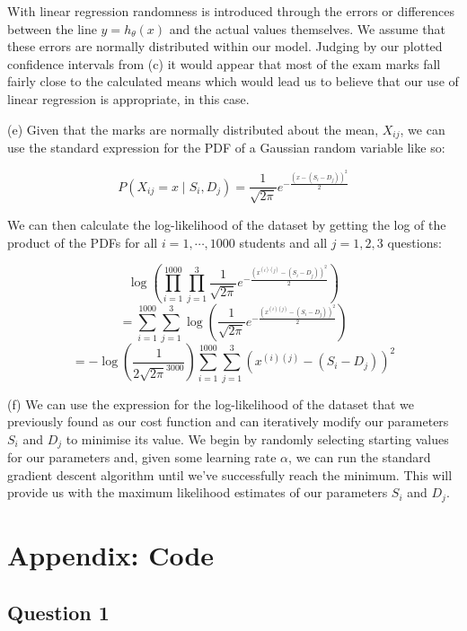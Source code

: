 \documentclass[10pt]{article}
\begin{document}
With linear regression randomness is introduced through the errors or differences between the line $y = h_{\theta}(x)$ and the actual values themselves. We assume that these errors are normally distributed within our model. Judging by our plotted confidence intervals from (c) it would appear that most of the exam marks fall fairly close to the calculated means which would lead us to believe that our use of linear regression is appropriate, in this case.

\noindent (e) Given that the marks are normally distributed about the mean, $X_{ij}$, we can use the standard expression for the PDF of a Gaussian random variable like so:

$$P(X_{ij} = x \mid S_i, D_j) = \frac{1}{\sqrt{2\pi}} e^{-\frac{(x - (S_i - D_j))^2}{2}}$$

We can then calculate the log-likelihood of the dataset by getting the log of the product of the PDFs for all $i = 1, \cdots, 1000$ students and all $j = 1, 2, 3$ questions:

$$\log \left( \prod_{i=1}^{1000} \prod_{j=1}^3 \frac{1}{\sqrt{2\pi}} e^{-\frac{(x^{(i)(j)} - (S_i - D_j))^2}{2}} \right)$$
$$= \sum_{i=1}^{1000} \sum_{j=1}^3 \log \left( \frac{1}{\sqrt{2\pi}} e^{-\frac{(x^{(i)(j)} - (S_i - D_j))^2}{2}} \right)$$
$$=- \log \left( \frac{1}{2\sqrt{2\pi}^{3000}} \right) \sum_{i=1}^{1000} \sum_{j=1}^{3} (x^{(i)(j)} - (S_i - D_j))^2$$

\noindent (f) We can use the expression for the log-likelihood of the dataset that we previously found as our cost function and can iteratively modify our parameters $S_i$ and $D_j$ to minimise its value. We begin by randomly selecting starting values for our parameters and, given some learning rate $\alpha$, we can run the standard gradient descent algorithm until we've successfully reach the minimum. This will provide us with the maximum likelihood estimates of our parameters $S_i$ and $D_j$.

\section*{Appendix: Code}

\subsection*{Question 1}
\end{document}
